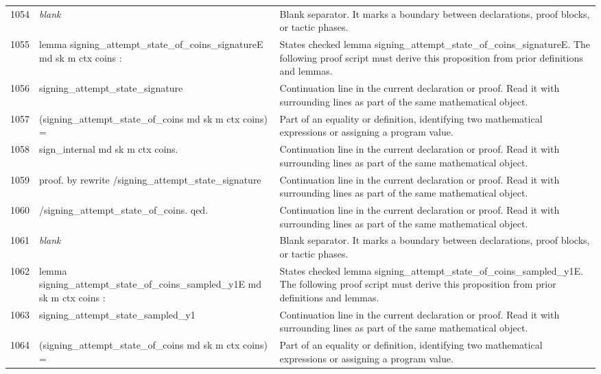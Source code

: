 \documentclass[10pt]{article}
\begin{document}
\begin{longtable}{r L{0.53\textwidth} L{0.37\textwidth}}
1054 & {\ttfamily\scriptsize \emph{blank}} & Blank separator.  It marks a boundary between declarations, proof blocks, or tactic phases. \\
1055 & {\ttfamily\scriptsize lemma signing\_attempt\_state\_of\_coins\_signatureE md sk m ctx coins :} & States checked lemma signing\_attempt\_state\_of\_coins\_signatureE.  The following proof script must derive this proposition from prior definitions and lemmas. \\
1056 & {\ttfamily\scriptsize   signing\_attempt\_state\_signature} & Continuation line in the current declaration or proof.  Read it with surrounding lines as part of the same mathematical object. \\
1057 & {\ttfamily\scriptsize     (signing\_attempt\_state\_of\_coins md sk m ctx coins) =} & Part of an equality or definition, identifying two mathematical expressions or assigning a program value. \\
1058 & {\ttfamily\scriptsize   sign\_internal md sk m ctx coins.} & Continuation line in the current declaration or proof.  Read it with surrounding lines as part of the same mathematical object. \\
1059 & {\ttfamily\scriptsize proof. by rewrite /signing\_attempt\_state\_signature} & Continuation line in the current declaration or proof.  Read it with surrounding lines as part of the same mathematical object. \\
1060 & {\ttfamily\scriptsize 	                  /signing\_attempt\_state\_of\_coins. qed.} & Continuation line in the current declaration or proof.  Read it with surrounding lines as part of the same mathematical object. \\
1061 & {\ttfamily\scriptsize \emph{blank}} & Blank separator.  It marks a boundary between declarations, proof blocks, or tactic phases. \\
1062 & {\ttfamily\scriptsize lemma signing\_attempt\_state\_of\_coins\_sampled\_y1E md sk m ctx coins :} & States checked lemma signing\_attempt\_state\_of\_coins\_sampled\_y1E.  The following proof script must derive this proposition from prior definitions and lemmas. \\
1063 & {\ttfamily\scriptsize   signing\_attempt\_state\_sampled\_y1} & Continuation line in the current declaration or proof.  Read it with surrounding lines as part of the same mathematical object. \\
1064 & {\ttfamily\scriptsize     (signing\_attempt\_state\_of\_coins md sk m ctx coins) =} & Part of an equality or definition, identifying two mathematical expressions or assigning a program value. \\

\end{longtable}
\end{document}
